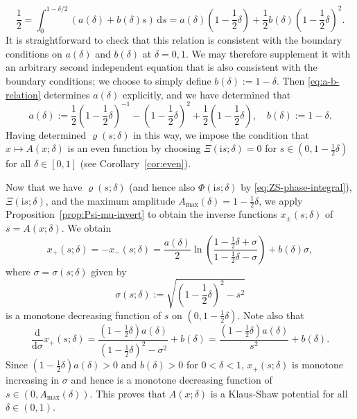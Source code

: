 \documentclass[12pt]{amsart}
\numberwithin{equation}{section}
\newcommand{\dd}{\mathrm{d}}
\newcommand{\ii}{\mathrm{i}}
\newcommand{\phaseint}{\Phi}
\newcommand{\tailint}{\Xi}
\newcommand{\evdensity}{\varrho}
\begin{document}
\begin{equation}
\frac{1}{2}=\int_0^{1-\delta/2}(a(\delta)+b(\delta)s)\,\dd s = a(\delta)\left(1-\frac{1}{2}\delta\right)+\frac{1}{2}b(\delta)\left(1-\frac{1}{2}\delta\right)^2.
\label{eq:a-b-relation}
\end{equation}
It is straightforward to check that this relation is consistent with the boundary conditions on $a(\delta)$ and $b(\delta)$ at $\delta=0,1$.  We may therefore supplement it with an arbitrary second independent equation that is also consistent with the boundary conditions; we choose to simply define $b(\delta):=1-\delta$.  Then \eqref{eq:a-b-relation} determines $a(\delta)$ explicitly, and we have determined that
\begin{equation}
a(\delta):=\frac{1}{2}\left(1-\frac{1}{2}\delta\right)^{-1}-\left(1-\frac{1}{2}\delta\right)^2+\frac{1}{2}\left(1-\frac{1}{2}\delta\right),\quad b(\delta):=1-\delta.
\end{equation}
Having determined $\evdensity(s;\delta)$ in this way, we impose the condition that $x\mapsto A(x;\delta)$ is an even function by choosing $\tailint(\ii s;\delta)=0$ for $s\in (0,1-\frac{1}{2}\delta)$ for all $\delta\in [0,1]$ (see Corollary~\ref{cor:even}). 

Now that we have $\evdensity(s;\delta)$ (and hence also $\phaseint(\ii s;\delta)$ by \eqref{eq:ZS-phase-integral}), $\tailint(\ii s;\delta)$, and the maximum amplitude $A_\mathrm{max}(\delta)=1-\frac{1}{2}\delta$, we apply Proposition~\ref{prop:Psi-mu-invert} to obtain the inverse functions $x_\pm(s;\delta)$ of $s=A(x;\delta)$.  We obtain
\begin{equation}
x_+(s;\delta)=-x_-(s;\delta)=\frac{a(\delta)}{2}\ln\left(\frac{1-\frac{1}{2}\delta+\sigma}{1-\frac{1}{2}\delta-\sigma}\right)+b(\delta)\sigma,
\end{equation}
where $\sigma=\sigma(s;\delta)$ given by
\begin{equation}
\sigma(s;\delta):=\sqrt{\left(1-\frac{1}{2}\delta\right)^2-s^2}
\end{equation}
is a monotone decreasing function of $s$ on $(0,1-\frac{1}{2}\delta)$. Note also that
\begin{equation}
\frac{\dd}{\dd\sigma}x_+(s;\delta)=\frac{(1-\frac{1}{2}\delta)a(\delta)}{(1-\frac{1}{2}\delta)^2-\sigma^2} + b(\delta)=\frac{(1-\frac{1}{2}\delta)a(\delta)}{s^2}+b(\delta).
\end{equation}
Since $(1-\frac{1}{2}\delta)a(\delta)>0$ and $b(\delta)>0$ for $0<\delta<1$, $x_+(s;\delta)$ is monotone increasing in $\sigma$ and hence is a monotone decreasing function of $s\in (0,A_\mathrm{max}(\delta))$.  This proves that $A(x;\delta)$ is a Klaus-Shaw potential for all $\delta\in (0,1)$.  
\end{document}
